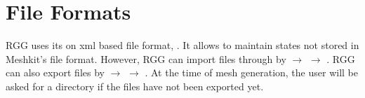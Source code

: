 \section{File Formats}

RGG uses its on xml based file format, .  It allows to maintain states not stored in Meshkit's  file format.  However, RGG can import  files through by  $\rightarrow$  $\rightarrow$ .  RGG can also export  files by  $\rightarrow$  $\rightarrow$ .  At the time of mesh generation, the user will be asked for a directory if the  files have not been exported yet.
